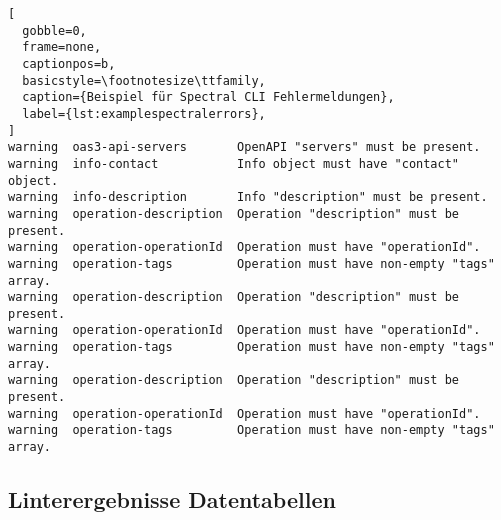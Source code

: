 \lstset{language=SpectralOutput}
\begin{lstlisting}[
  gobble=0,
  frame=none,
  captionpos=b,
  basicstyle=\footnotesize\ttfamily,
  caption={Beispiel für Spectral CLI Fehlermeldungen},
  label={lst:examplespectralerrors},
]
warning  oas3-api-servers       OpenAPI "servers" must be present.
warning  info-contact           Info object must have "contact" object.                        
warning  info-description       Info "description" must be present.       
warning  operation-description  Operation "description" must be present.  
warning  operation-operationId  Operation must have "operationId".                             
warning  operation-tags         Operation must have non-empty "tags" array.                    
warning  operation-description  Operation "description" must be present.  
warning  operation-operationId  Operation must have "operationId".                             
warning  operation-tags         Operation must have non-empty "tags" array.                    
warning  operation-description  Operation "description" must be present.  
warning  operation-operationId  Operation must have "operationId".                             
warning  operation-tags         Operation must have non-empty "tags" array.                    
\end{lstlisting}

\newpage
\subsection*{Linterergebnisse Datentabellen} \label{sec:linterergebnissedatentabellen}

